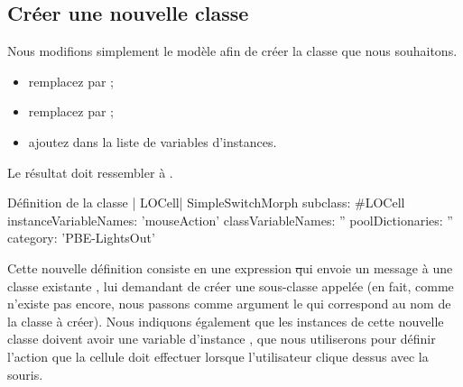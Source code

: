 \documentclass[a4paper,10pt,twoside]{book}
\begin{document}

\subsection{Créer une nouvelle classe}

Nous modifions simplement le modèle afin de créer la classe que nous souhaitons.

\begin{itemize}
  \item remplacez  par ;
  \item remplacez  par ;
  \item ajoutez  dans la liste de variables d'instances.
\end{itemize}
Le résultat doit ressembler à .

\begin{classdef}[firstClassDef]{Définition de la classe \ct| LOCell|}
SimpleSwitchMorph subclass: #LOCell
   instanceVariableNames: 'mouseAction'
   classVariableNames: ''
   poolDictionaries: ''
   category: 'PBE-LightsOut'
\end{classdef}

Cette nouvelle définition consiste en une expression \st qui envoie un message à une classe existante , lui demandant de créer une sous-classe appelée 
(en fait, comme  n'existe pas encore, nous passons comme argument le   qui correspond au nom de la classe à créer).
Nous indiquons également que les instances de cette nouvelle classe doivent avoir une variable d'instance , que nous utiliserons pour définir l'action que la cellule doit effectuer lorsque l'utilisateur clique dessus avec la souris.
\end{document}
